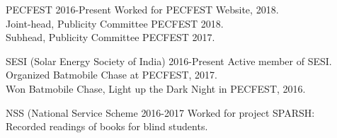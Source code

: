  
\begin{entryzlist}

\entryz

{PECFEST {}}
{2016-Present}
{\small Worked for PECFEST Website, 2018.
\\
Joint-head, Publicity Committee PECFEST 2018.
\\
Subhead, Publicity Committee PECFEST 2017.}

\entryz

{SESI (Solar Energy Society of India) {}}
{2016-Present}
{\small Active member of SESI.
\\
Organized Batmobile Chase at PECFEST, 2017.
\\
Won Batmobile Chase, Light up the Dark Night in PECFEST, 2016.
}


\entryz

{NSS (National Service Scheme {}}
{2016-2017}
{\small Worked for project SPARSH: 
\\
Recorded readings of books for blind students.}



\end{entryzlist}